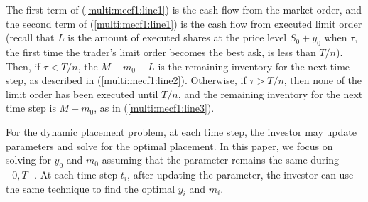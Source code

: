 \documentclass[11pt]{article}
\theoremstyle{plain}
\numberwithin{equation}{section}
\begin{document}
The first term of (\ref{multi:mecf1:line1}) is the cash flow from the market order, and the second term of (\ref{multi:mecf1:line1})
is the cash flow from executed limit order (recall that $L$ is the amount of executed shares at the price level $S_0+y_0$ when $\tau$, the first time the trader's limit order becomes the best ask, is less than $T/n$). Then, if $\tau<T/n$, the $M-m_0-L$ is the remaining inventory for the next time step, as described in (\ref{multi:mecf1:line2}). Otherwise, if $\tau>T/n$, then none of the limit order has been executed until $T/n$, and the remaining inventory for the next time step is $M-m_0$, as in (\ref{multi:mecf1:line3}). 





\par For the dynamic placement problem, at each time step, the investor may update parameters and solve for the optimal placement. In this paper, we focus on solving for $y_0$ and $m_0$ assuming that the parameter remains the same during $[0,T]$. At each time step $t_i$, after updating the parameter, the investor can use the same technique to find the optimal  $y_i$ and $m_i$. %






\end{document}
